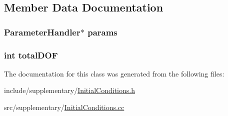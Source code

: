 \subsection{Member Data Documentation}
\subsubsection[{params}]{\setlength{\rightskip}{0pt plus 5cm}Parameter\-Handler$\ast$ params}\label{class_initial_conditions_a31d5e7a5228d9d55ba00fae854fcfaa0}
\subsubsection[{total\-D\-O\-F}]{\setlength{\rightskip}{0pt plus 5cm}int total\-D\-O\-F}\label{class_initial_conditions_acf5f14c806d215a0bf5c9f46d3e23607}


The documentation for this class was generated from the following files\-:\begin{DoxyCompactItemize}
\item 
include/supplementary/\hyperlink{_initial_conditions_8h}{Initial\-Conditions.\-h}\item 
src/supplementary/\hyperlink{_initial_conditions_8cc}{Initial\-Conditions.\-cc}\end{DoxyCompactItemize}
